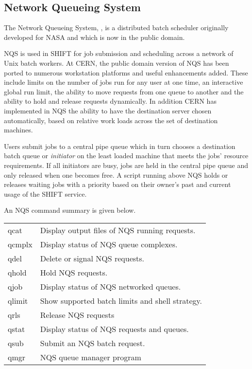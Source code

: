  
\subsection {Network Queueing System}
 
The Network Queueing System, \NQS, is a distributed batch scheduler originally
 developed
for NASA and which is now in the public domain.
 
 
NQS is used in SHIFT for
job submission and scheduling across a network
of Unix batch workers. At CERN, the public domain version of NQS has
been ported to numerous workstation platforms and useful enhancements
added. These include limits on the number of jobs run for any user
at one time, an interactive global run
limit, the ability to move requests from one queue to another and the
ability to hold and release requests dynamically.  In addition
CERN has implemented in
NQS the ability to have the destination server chosen automatically, based
on relative work loads across the set of destination machines.
 
Users submit
jobs to a central pipe queue which in turn chooses a destination batch queue
or
{\em initiator}
on the least loaded machine that meets the jobs' resource requirements.
If all initiators are busy, jobs are held in the central pipe queue and only
released when one becomes free.
A script running above NQS holds or releases waiting jobs
with a priority based on their owner's past and current
usage of the SHIFT service.
 
An NQS command summary is given below.
 
\begin{center}
\begin{tabular}{ll}
qcat   & Display output files of NQS running requests.          \\
qcmplx & Display status of NQS queue complexes.                 \\
qdel   & Delete or signal NQS requests.                         \\
qhold  & Hold NQS requests.                                     \\
qjob   & Display status of NQS networked queues.                \\
qlimit & Show supported batch limits and shell strategy.        \\
qrls   & Release NQS requests                                   \\
qstat  & Display status of NQS requests and queues.             \\
qsub   & Submit an NQS batch request.                           \\
qmgr   & NQS queue manager program                              \\
\end{tabular}
\end{center}
 
